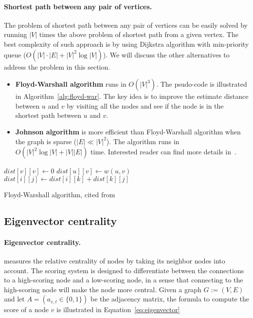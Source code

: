 \paragraph{Shortest path between any pair of vertices.}
The problem of shortest path between any pair of vertices can be easily solved by running $|V|$ times the above problem of shortest path from a given vertex. The best complexity of such approach is by using Dijkstra algorithm with min-priority queue ($O(|V|\cdot|E|+|V|^2\log|V|)$). We will discuss the other alternatives to address the problem in this section.
	\begin{itemize}	
		\item {\bf Floyd-Warshall algorithm} runs in $O(|V|^3)$. The psudo-code is illustrated in Algorithm~\ref{alg:floyd-war}. The key idea is to improve the estimate distance between $u$ and $v$ by visiting all the nodes and see if the node is in the shortest path between $u$ and $v$.

	 	\item {\bf Johnson algorithm} is more efficient than Floyd-Warshall algorithm when the graph is sparse ($|E| \ll |V|^2$). The algorithm runs in $O(|V|^2\log|V| + |V||E|)$ time. Interested reader can find more details in~\cite{johnson-alg}.
	\end{itemize}

\begin{algorithm}
	\begin{algorithmic}[1]		
		   \State $dist[v][v] \gets 0$	
		\EndFor
		   \State $dist[u][v] \gets w(u,v)$  
		\EndFor
		            \State $dist[i][j]\gets  dist[i][k] + dist[k][j]$
		        \EndIf
		      \EndFor
		    \EndFor
		\EndFor
	\end{algorithmic}
\caption{Floyd-Warshall algorithm, cited from~\cite{floyd-war-wiki}}
\label{alg:floyd-war}
\end{algorithm}

\subsection{Eigenvector centrality}
\paragraph{Eigenvector centrality.} measures the relative centrality of nodes by taking its neighbor nodes into account. The scoring system is designed to differentiate between the connections to a high-scoring node and a low-scoring node, in a sense that connecting to the high-scoring node will make the node more central. Given a graph $G:=(V,E)$ and let $A = (a_{v,t}\in\{0, 1\})$ be the adjacency matrix, the formula to compute the score of a node $v$ is illustrated in Equation~\eqref{eq:eigenvector}

